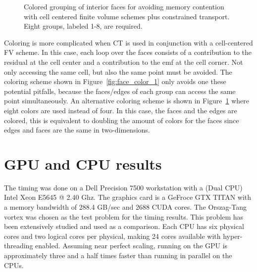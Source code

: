 \begin{figure}[htbp]\figSpace
\begin{center}

\end{center}
\caption{Colored grouping of interior faces for avoiding memory contention with cell centered finite volume schemes plus constrained transport.  Eight groups, labeled 1-8, are required.}
\label{fig:face_color_2}
\figSpace
\end{figure}

Coloring is more complicated when CT is used in conjunction with a cell-centered FV scheme.  In this case, each loop over the faces consists of a contribution to the residual at the cell center and a contribution to the emf at the cell corner.  Not only accessing the same cell, but also the same point must be avoided.  The coloring scheme shown in Figure~\ref{fig:face_color_1} only avoids one these potential pitfalls, because the faces/edges of each group can access the same point simultaneously.  An alternative coloring scheme is shown in Figure~\ref{fig:face_color_2} where eight colors are used instead of four.  In this case, the faces and the edges are colored,  this is equivalent to doubling the amount of colors for the faces since edges and faces are the same in two-dimensions.

\section[GPU and CPU results]{GPU and CPU results}
\label{sec:gpu_results}

The timing was done on a Dell Precision 7500 workstation with a (Dual CPU) Intel Xeon E5645 @ 2.40 Ghz.  The graphics card is a GeFroce GTX TITAN with a memory bandwidth of 288.4 GB/sec and 2688 CUDA cores.  The Orszag-Tang vortex \citep{Orszag:1979} was chosen as the test problem for the timing results.  This problem has been extensively studied and used as a comparison.  Each CPU has six physical cores and two logical cores per physical, making 24 cores available with hyper-threading enabled.  Assuming near perfect scaling, running on the GPU is approximately three and a half times faster than running in parallel on the CPUs.

